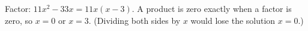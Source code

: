 Factor: $11x^2-33x=11x(x-3)$. A product is zero exactly when a factor is zero, so $\boxed{x=0\text{ or }x=3}$. (Dividing both sides by $x$ would lose the solution $x=0$.)

